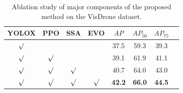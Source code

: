 \documentclass[letterpaper]{article} %
\begin{document}
\begin{table}[!t]
 \centering
  \begin{tabular}{cccccccc}
  \hline
  YOLOX & PPO & SSA & EVO & ${AP}$ & ${AP_{50}}$ & ${AP_{75}}$ \\
  \hline
  $\surd$ & & & & 37.5 & 59.3 & 39.3 \\
  $\surd$ & $\surd$ & & & 39.1 & 61.9 & 41.1 \\
  $\surd$ & $\surd$ & $\surd$ & & 40.7 & 64.0 & 43.0 \\
  $\surd$ & $\surd$ & $\surd$ & $\surd$ & \textbf{42.2} & \textbf{66.0} & \textbf{44.5} \\
  \hline
  \end{tabular}%
 \caption{Ablation study of major components of the proposed method on the VisDrone dataset.
 }
 \label{tab:ablation}%
\end{table}%


\end{document}
